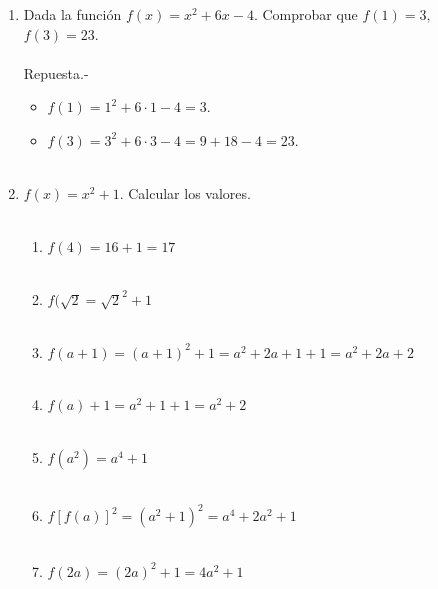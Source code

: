 \begin{enumerate}

    \item Dada la función $f(x)=x^2+6x-4.$ Comprobar que $f(1)=3,$ $f(3)=23$.\\\\
	Repuesta.-\;
	\begin{itemize}
	    \item $f(1)=1^2 + 6\cdot 1 -4 = 3$.
	    \item $f(3)=3^2 + 6\cdot 3 - 4 = 9 + 18 - 4 = 23$.\\\\
	\end{itemize}

    \item $f(x) = x^2 + 1$. Calcular los valores.\\\\
	\begin{enumerate}[\bfseries a)]

	    \item $f(4)=16 + 1 = 17$\\\\

	    \item $f(\sqrt{2}=\sqrt{2}^2 + 1$\\\\

	    \item $f(a+1) = (a+1)^2 + 1 = a^2 + 2a + 1 + 1 = a^2 + 2a + 2$\\\\

	    \item $f(a)+1= a^2 + 1 + 1 = a^2 + 2$\\\\

	    \item $f(a^2) = a^4 + 1$\\\\

	    \item $f[f(a)]^2 = (a^2 + 1)^2 = a^4 + 2a^2 + 1$\\\\

	    \item $f(2a) = (2a)^2 + 1 = 4a^2 +1$\\\\


\end{enumerate}
\end{enumerate}
